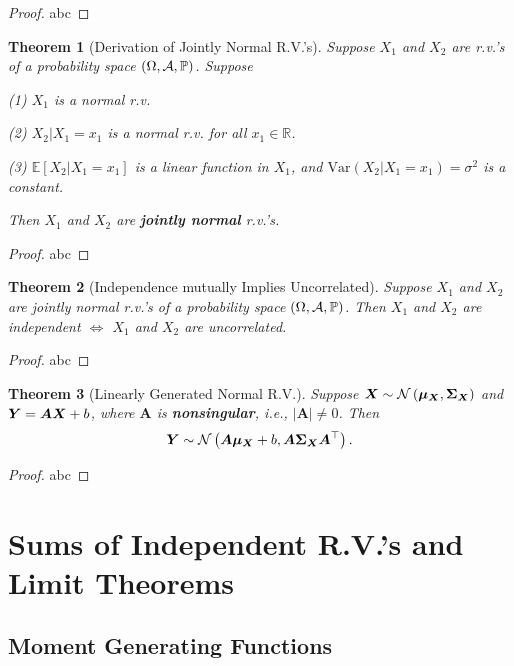\documentclass[openany,12pt]{book}
\newtheorem{theorem}{Theorem}[chapter]
\begin{document}
\begin{proof}
  abc
\end{proof}

\begin{theorem}[Derivation of Jointly Normal R.V.'s]
  Suppose $X_{1}$ and $X_{2}$ are r.v.'s of a probability space $(\Omega,\mathcal{A},\mathbb{P})$. Suppose

  (1) $X_{1}$ is a normal r.v.

  (2) $X_{2}|X_{1} = x_{1}$ is a normal r.v. for all
  $x_{1}\mathbb{\in R}$.

  (3) $\mathbb{E}[ X_{2} | X_{1} = x_{1}]$ is a
  linear function in $X_{1}$, and
  $\mathrm{Var}( X_{2}| X_{1} = x_{1})= \sigma^{2}$
  is a constant.

  Then $X_{1}$ and $X_{2}$ are \textbf{jointly normal} r.v.'s.
\end{theorem}

\begin{proof}
  abc
\end{proof}

\begin{theorem}[Independence mutually Implies Uncorrelated]
  Suppose $X_{1}$ and $X_{2}$ are jointly normal r.v.'s of a probability space $(\Omega,\mathcal{A},\mathbb{P})$. Then $X_{1}$ and $X_{2}$ are independent
  $\Leftrightarrow$ $X_{1}$ and $X_{2}$ are uncorrelated.
\end{theorem}

\begin{proof}
  abc
\end{proof}

\begin{theorem}[Linearly Generated Normal R.V.]
  Suppose $\bm{X}\sim \mathcal{N}\left( {\bm{\mu}}_{\bm{X}},\bm{\Sigma}_{\bm{X}} \right)$ and $\bm{Y}= \bm{A}\bm{X} + b$, where $\bm{A}$ is \textbf{nonsingular}, i.e., $|\bm{A}| \neq 0$.
  Then
  \[\bm{Y}\sim \mathcal{N}\left( \bm{A}{\bm{\mu}}_{\bm{X}} + b,\bm{A}\bm{\Sigma}_{\bm{X}}\bm{A}^{\top} \right).\]
\end{theorem}

\begin{proof}
  abc
\end{proof}

\chapter{Sums of Independent R.V.'s and Limit Theorems}

\section{Moment Generating Functions}
\end{document}
